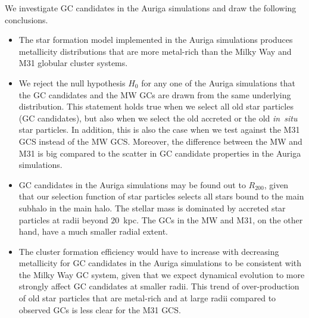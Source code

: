 \documentclass[a4paper,fleqn,usenatbib]{mnras}
\begin{document}
We investigate GC candidates in the Auriga simulations and draw the following
conclusions.

\begin{itemize}
    \item The star formation model implemented in the Auriga simulations produces
    metallicity distributions that are more metal-rich than the Milky Way and M31
    globular cluster systems.

    \item We reject the null hypothesis $H_0$ for any one of the Auriga simulations 
    that the GC candidates and the MW GCs are drawn from the same underlying 
    distribution. This statement holds true when we select all old star particles 
    (GC candidates), but also when we select the old accreted or the old {\it in~situ} 
    star particles. In addition, this is also the case when we test against the 
    M31 GCS instead of the MW GCS. Moreover, the difference between the MW and
    M31 is big compared to the scatter in GC candidate properties in the Auriga
    simulations.

    \item GC candidates in the Auriga simulations may be found out to $R_{200}$,
    given that our selection function of star particles selects all stars bound
    to the main subhalo in the main halo. The stellar mass is dominated by accreted 
    star particles at radii beyond $20$~kpc. The GCs in the MW and M31, on the 
    other hand, have a much smaller radial extent.

    \item The cluster formation efficiency would have to increase with decreasing
    metallicity for GC candidates in the Auriga simulations to be consistent
    with the Milky Way GC system, given that we expect dynamical evolution to 
    more strongly affect GC candidates at smaller radii. This trend of over-production
    of old star particles that are metal-rich and at large radii compared to 
    observed GCs is less clear for the M31 GCS.

\end{itemize}
\end{document}
